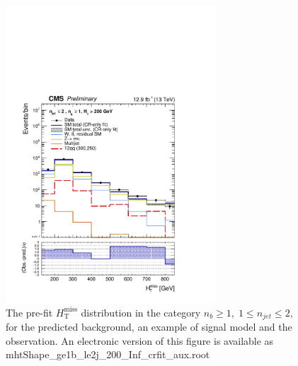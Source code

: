 \clearpage
\begin{figure}[tbhp]
    \caption{ 
    The pre-fit $H_{\mathrm{T}}^{\mathrm{miss}}$ distribution in the category $n_{b}\geq 1, \; 1 \leq n_{jet} \leq 2$, 
    for the predicted background, an example of signal model and the observation.
    An electronic version of this figure is available as mhtShape\_ge1b\_le2j\_200\_Inf\_crfit\_aux.root
    \label{fig:mhtShape_ge1b_le2j_crfit} }
  \begin{center}
  \includegraphics[width=0.7\textwidth]{mhtShape_ge1b_le2j_200_Inf_crfit_aux}
  \end{center}
\end{figure}


